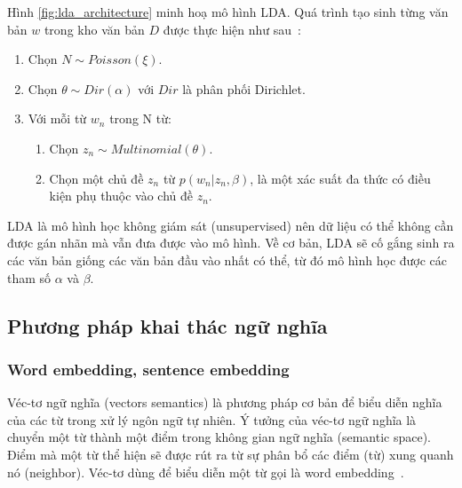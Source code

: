 

Hình \ref{fig:lda_architecture} minh hoạ mô hình LDA. Quá trình tạo sinh từng
văn bản $w$ trong kho văn bản $D$ được thực hiện như
sau~\cite{bleiLatentDirichletAllocation2003}:

\begin{enumerate}
	\item Chọn $N \sim Poisson(\xi)$.
	\item Chọn $\theta \sim Dir(\alpha)$ với $Dir$ là phân phối Dirichlet.
	\item Với mỗi từ $w_n$ trong N từ:
	\begin{enumerate}
		\item Chọn $z_n \sim Multinomial(\theta)$.
		\item Chọn một chủ đề $z_n$ từ $p(w_n|z_n,\beta)$, là một xác suất đa
		thức có điều kiện phụ thuộc vào chủ đề $z_n$.
	\end{enumerate}
\end{enumerate}

LDA là mô hình học không giám sát (unsupervised) nên dữ liệu có thể không cần
được gán nhãn mà vẫn đưa được vào mô hình. Về cơ bản, LDA sẽ cố gắng sinh ra
các văn bản giống các văn bản đầu vào nhất có thể, từ đó mô hình học được các
tham số $\alpha$ và $\beta$.


\subsection{Phương pháp khai thác ngữ nghĩa}
\subsubsection{Word embedding, sentence embedding}
Véc-tơ ngữ nghĩa (vectors semantics) là phương pháp cơ bản để biểu diễn nghĩa
của các từ trong xử lý ngôn ngữ tự nhiên. Ý tưởng của véc-tơ ngữ nghĩa là
chuyển một từ thành một điểm trong không gian ngữ nghĩa (semantic space). Điểm
mà một từ thể hiện sẽ được rút ra từ sự phân bổ các điểm (từ) xung quanh nó
(neighbor). Véc-tơ dùng để biểu diễn một từ gọi là word
embedding~\cite{jurafskySpeechLanguageProcessing}.

